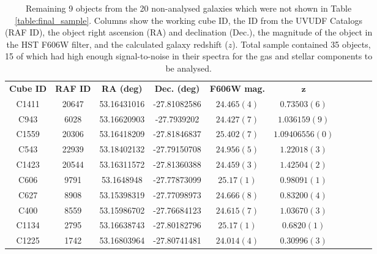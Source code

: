 \documentclass[12pt, twocolumn]{revtex4-1}    %
\begin{document}
\begin{table}[h!]
\centering
\begin{tabular}{c@{\hskip 10pt}c@{\hskip 10pt}c@{\hskip 10pt}c@{\hskip 10pt}c@{\hskip 10pt}c@{\hskip 10pt}c@{\hskip 10pt}c@{\hskip 10pt}c@{\hskip 10pt}c} 
 \hline
 \textbf{Cube ID} & \textbf{RAF ID} & \textbf{RA (deg)} & \textbf{Dec. (deg)} & \textbf{F606W mag.} & \textbf{$\boldsymbol{z}$}  \\ [0.5ex] 
C1411 & 20647 & 53.16431016 & -27.81082586 & $24.465(4)$ & $0.73503(6)$ \\ 

C943 & 6028 & 53.16620903 & -27.7939202 & $24.427(7)$ & $1.036159(9)$ \\ 

C1559 & 20306 & 53.16418209 & -27.81846837 & $25.402(7)$ & $1.09406556(0)$ \\ 

C543 & 22939 & 53.18402132 & -27.79150708 & $24.956(5)$ & $1.22018(3)$ \\ 

C1423 & 20544 & 53.16311572 & -27.81360388 & $24.459(3)$ & $1.42504(2)$ \\ 

C606 & 9791 & 53.1648948 & -27.77873099 & $25.17(1)$ & $0.98091(1)$ \\ 

C627 & 8908 & 53.15398319 & -27.77098973 & $24.666(8)$ & $0.83200(4)$ \\ 

C400 & 8559 & 53.15986702 & -27.76684123 & $24.615(7)$ & $1.03670(3)$ \\ 

C1134 & 2795 & 53.16638743 & -27.80182796 & $25.17(1)$ & $0.6820(1)$ \\ 

C1225 & 1742 & 53.16803964 & -27.80741481 & $24.014(4)$ & $0.30996(3)$ \\ 
 \hline
\end{tabular}
\caption{Remaining 9 objects from the 20 non-analysed galaxies which were not shown in Table \ref{table:final_sample}. Columns show the working cube ID, the ID from the UVUDF Catalogs \citep{2015AJ....150...31R} (RAF ID), the object right ascension (RA) and declination (Dec.), the magnitude of the object in the HST F606W filter, and the calculated galaxy redshift ($z$). Total sample contained 35 objects, 15 of which had high enough signal-to-noise in their spectra for the gas and stellar components to be analysed.}
\label{table:rest_of_final_sample}
\end{table}
\end{document}
